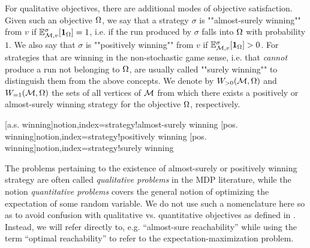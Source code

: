 For qualitative objectives, there are additional modes of objective satisfaction. Given such an objective $\Omega$, we say that a strategy $\sigma$ is ""almost-surely winning"" from $v$ if $\mathbb{E}^{\sigma}_{\mathcal{M},v}[\mathbf{1}_{\Omega}]=1$, i.e. if the run produced by $\sigma$ falls into $\Omega$ with probability $1$. We also say that $\sigma$ is ""positively winning"" from $ v $ if $\mathbb{E}^{\sigma}_{\mathcal{M},v}[\mathbf{1}_{\Omega}]>0$. For strategies that are winning in the non-stochastic game sense, i.e. that \emph{cannot} produce a run not belonging to $\Omega$, are usually called ""surely winning"" to distinguish them from the above concepts. We denote by $W_{>0}(\mathcal{M},\Omega)$ and $W_{=1}(\mathcal{M},\Omega)$ the sets of all vertices of $\mathcal{M}$ from which there exists a positively or almost-surely winning strategy for the objective $\Omega$, respectively.

[a.s. winning]{notion,index={strategy!almost-surely winning}}
[pos. winning]{notion,index={strategy!positively winning}}
[pos. winning]{notion,index={strategy!surely winning}}


The problems pertaining to the existence of almost-surely or positively winning strategy are often called \emph{qualitative problems} in the MDP literature, while the notion \emph{quantitative problems} covers the general notion of optimizing the expectation of some random variable. We do not use such a nomenclature here so as to avoid confusion with qualitative vs. quantitative objectives as defined in . Instead, we will refer directly to, e.g. ``almost-sure reachability'' while using the term ``optimal reachability'' to refer to the expectation-maximization problem.

%


%
